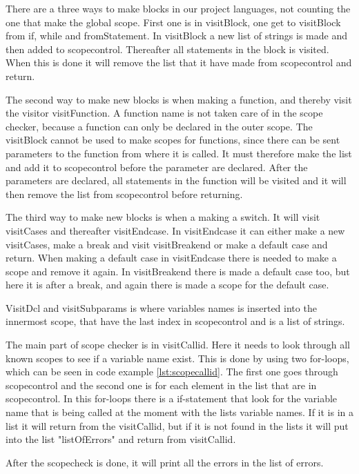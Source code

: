 There are a three ways to make blocks in our project languages, not counting the one that make the global scope. First one is in visitBlock, one get to visitBlock from if, while and fromStatement. In visitBlock a new list of strings is made and then added to scopecontrol. Thereafter all statements in the block is visited. When this is done it will remove the list that it have made from scopecontrol and return.

The second way to make new blocks is when making a function, and thereby visit the visitor visitFunction. A function name is not taken care of in the scope checker, because a function can only be declared in the outer scope. The visitBlock cannot be used to make scopes for functions, since there can be sent parameters to the function from where it is called. It must therefore make the list and add it to scopecontrol before the parameter are declared. After the parameters are declared, all statements in the function will be visited and it will then remove the list from scopecontrol before returning.

The third way to make new blocks is when a making a switch. It will visit visitCases and thereafter visitEndcase. In visitEndcase it can either make a new visitCases, make a break and visit visitBreakend or make a default case and return. When making a default case in visitEndcase there is needed to make a scope and remove it again. In visitBreakend there is made a default case too, but here it is after a break, and again there is made a scope for the default case.


VisitDcl and visitSubparams is where variables names is inserted into the innermost scope, that have the last index in scopecontrol and is a list of strings.

The main part of scope checker is in visitCallid. Here it needs to look through all known scopes to see if a variable name exist. This is done by using two for-loops, which can be seen in code example \ref{lst:scopecallid}. The first one goes through scopecontrol and the second one is for each element in the list that are in scopecontrol. In this for-loops there is a if-statement that look for the variable name that is being called at the moment with the lists variable names. If it is in a list it will return from the visitCallid, but if it is not found in the lists it will put into the list "listOfErrors" and return from visitCallid.


After the scopecheck is done, it will print all the errors in the list of errors.
